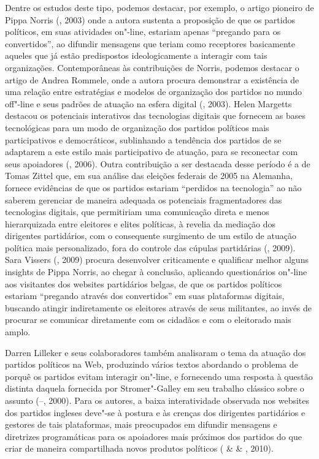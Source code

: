 Dentre os estudos deste tipo, podemos destacar, por exemplo, o artigo
pioneiro de Pippa Norris (, 2003) onde a autora sustenta a
proposição de que os partidos políticos, em suas atividades on"-line,
estariam apenas ``pregando para os convertidos'', ao difundir mensagens
que teriam como receptores basicamente aqueles que já estão predispostos
ideologicamente a interagir com tais organizações. Contemporâneas às
contribuições de Norris, podemos destacar o artigo de Andrea Rommele,
onde a autora procura demonstrar a existência de uma relação entre
estratégias e modelos de organização dos partidos no mundo off"-line e
seus padrões de atuação na esfera digital (, 2003). Helen
Margetts destacou os potenciais interativos das tecnologias digitais que
fornecem as bases tecnológicas para um modo de organização dos partidos
políticos mais participativos e democráticos, sublinhando a tendência
dos partidos de se adaptarem a este estilo mais participativo de
atuação, para se reconectar com seus apoiadores (, 2006). Outra
contribuição a ser destacada desse período é a de Tomas Zittel que, em
sua análise das eleições federais de 2005 na Alemanha, fornece
evidências de que os partidos estariam ``perdidos na tecnologia'' ao não
saberem gerenciar de maneira adequada os potenciais fragmentadores das
tecnologias digitais, que permitiriam uma comunicação direta e menos
hierarquizada entre eleitores e elites políticas, à revelia da mediação
dos dirigentes partidários, com o consequente surgimento de um estilo de
atuação política mais personalizado, fora do controle das cúpulas
partidárias (, 2009). Sara Vissers (, 2009) procura
desenvolver criticamente e qualificar melhor alguns insights de Pippa
Norris, ao chegar à conclusão, aplicando questionários on"-line aos
visitantes dos websites partidários belgas, de que os partidos políticos
estariam ``pregando através dos convertidos'' em suas plataformas
digitais, buscando atingir indiretamente os eleitores através de seus
militantes, ao invés de procurar se comunicar diretamente com os
cidadãos e com o eleitorado mais amplo.

Darren Lilleker e seus colaboradores também analisaram o tema da atuação
dos partidos políticos na Web, produzindo vários textos abordando o
problema de porquê os partidos evitam interagir on"-line, e fornecendo
uma resposta à questão distinta daquela fornecida por Stromer"-Galley em
seu trabalho clássico sobre o assunto (--, 2000). Para os
autores, a baixa interatividade observada nos websites dos partidos
ingleses deve"-se à postura e às crenças dos dirigentes partidários e
gestores de tais plataformas, mais preocupados em difundir mensagens e
diretrizes programáticas para os apoiadores mais próximos dos partidos
do que criar de maneira compartilhada novos produtos políticos (
\&  \& , 2010).

